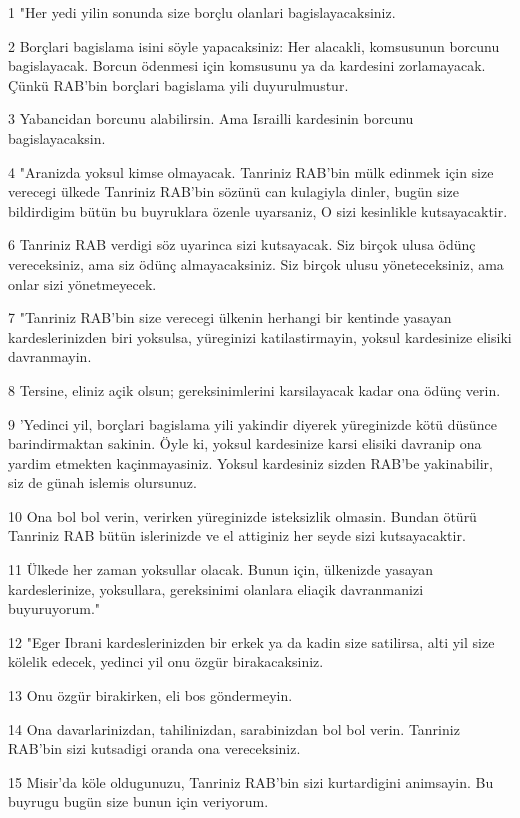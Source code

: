 \par 1 "Her yedi yilin sonunda size borçlu olanlari bagislayacaksiniz.
\par 2 Borçlari bagislama isini söyle yapacaksiniz: Her alacakli, komsusunun borcunu bagislayacak. Borcun ödenmesi için komsusunu ya da kardesini zorlamayacak. Çünkü RAB'bin borçlari bagislama yili duyurulmustur.
\par 3 Yabancidan borcunu alabilirsin. Ama Israilli kardesinin borcunu bagislayacaksin.
\par 4 "Aranizda yoksul kimse olmayacak. Tanriniz RAB'bin mülk edinmek için size verecegi ülkede Tanriniz RAB'bin sözünü can kulagiyla dinler, bugün size bildirdigim bütün bu buyruklara özenle uyarsaniz, O sizi kesinlikle kutsayacaktir.
\par 6 Tanriniz RAB verdigi söz uyarinca sizi kutsayacak. Siz birçok ulusa ödünç vereceksiniz, ama siz ödünç almayacaksiniz. Siz birçok ulusu yöneteceksiniz, ama onlar sizi yönetmeyecek.
\par 7 "Tanriniz RAB'bin size verecegi ülkenin herhangi bir kentinde yasayan kardeslerinizden biri yoksulsa, yüreginizi katilastirmayin, yoksul kardesinize elisiki davranmayin.
\par 8 Tersine, eliniz açik olsun; gereksinimlerini karsilayacak kadar ona ödünç verin.
\par 9 'Yedinci yil, borçlari bagislama yili yakindir diyerek yüreginizde kötü düsünce barindirmaktan sakinin. Öyle ki, yoksul kardesinize karsi elisiki davranip ona yardim etmekten kaçinmayasiniz. Yoksul kardesiniz sizden RAB'be yakinabilir, siz de günah islemis olursunuz.
\par 10 Ona bol bol verin, verirken yüreginizde isteksizlik olmasin. Bundan ötürü Tanriniz RAB bütün islerinizde ve el attiginiz her seyde sizi kutsayacaktir.
\par 11 Ülkede her zaman yoksullar olacak. Bunun için, ülkenizde yasayan kardeslerinize, yoksullara, gereksinimi olanlara eliaçik davranmanizi buyuruyorum."
\par 12 "Eger Ibrani kardeslerinizden bir erkek ya da kadin size satilirsa, alti yil size kölelik edecek, yedinci yil onu özgür birakacaksiniz.
\par 13 Onu özgür birakirken, eli bos göndermeyin.
\par 14 Ona davarlarinizdan, tahilinizdan, sarabinizdan bol bol verin. Tanriniz RAB'bin sizi kutsadigi oranda ona vereceksiniz.
\par 15 Misir'da köle oldugunuzu, Tanriniz RAB'bin sizi kurtardigini animsayin. Bu buyrugu bugün size bunun için veriyorum.
